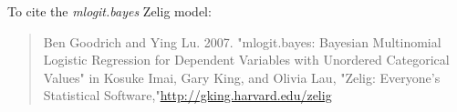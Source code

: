 To cite the \emph{ mlogit.bayes } Zelig model:
 \begin{verse}
 Ben Goodrich and Ying Lu. 2007. "mlogit.bayes: Bayesian Multinomial Logistic Regression for Dependent Variables with Unordered Categorical Values" in Kosuke Imai, Gary King, and Olivia Lau, "Zelig: Everyone's Statistical Software,"\url{http://gking.harvard.edu/zelig} 
\end{verse}